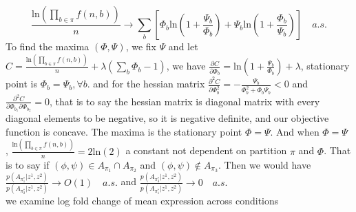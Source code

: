 \documentclass[11pt]{amsart}
\begin{document}
$$ \frac{\text{ln}(\prod_{b\in \pi} f(n,b))}{n} \rightarrow \sum_b [\Phi_b\text{ln}(1+\frac{\Psi_b}{\Phi_b}) + \Psi_b\text{ln}(1+\frac{\Phi_b}{\Psi_b})] \quad a.s.$$
To find the maxima $(\Phi, \Psi)$, we fix $\Psi$ and 
let $C =  \frac{\text{ln}(\prod_{b\in \pi} f(n,b))}{n} + \lambda(\sum_b \Phi_b - 1)$, we have $\frac{\partial C}{\partial \Phi_b} =  \text{ln}(1+\frac{\Psi_b}{\Phi_b}) + \lambda$, stationary point is $\Phi_b = \Psi_b, \forall b$. and for the hessian matrix $\frac{\partial^2 C}{\partial \Phi_b^2} = -\frac{\Psi_b}{\Phi_b^2 + \Phi_b\Psi_b} < 0$ and $\frac{\partial^2 C}{\partial \Phi_{b_1}\partial \Phi_{b_2}} = 0$, that is to say the hessian matrix is diagonal matrix with every diagonal elements to be negative, so it is negative definite, and our objective function is concave. The maxima is the stationary point $\Phi = \Psi$. 
And when $\Phi = \Psi$ , $\frac{\text{ln}(\prod_{b\in \pi} f(n,b))}{n} = 2\text{ln}(2)$ a constant not dependent on partition $\pi$ and $\Phi$. That is to say if $(\phi,\psi) \in A_{\pi_1}\cap A_{\pi_2}$ and $(\phi,\psi) \notin A_{\pi_3}$. Then we would have $\frac{p(A_{\pi_1^*} | z^1, z^2)}{p(A_{\pi_2^*} | z^1, z^2)} \rightarrow O(1)\quad a.s.$ and $\frac{p(A_{\pi_3^*} | z^1, z^2)}{p(A_{\pi_1^*} | z^1, z^2)} \rightarrow 0\quad a.s.$\\
\newpage
we examine log fold change of mean expression across conditions\\
\\
\end{document}
